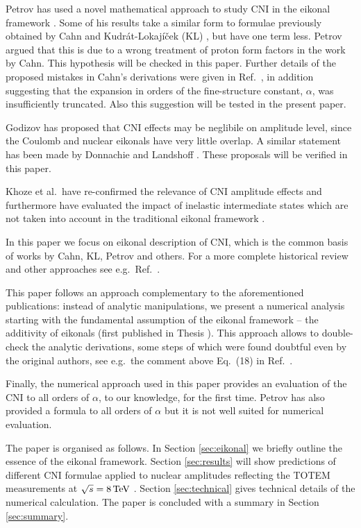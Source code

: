 \documentclass[pdftex,twocolumn,epjc3]{svjour3}
\def\un#1{\,{\rm #1}}
\begin{document}
Petrov has used a novel mathematical approach to study CNI in the eikonal framework \cite{petrov2018,petrov2018-erratum}. Some of his results take a similar form to formulae previously obtained by Cahn \cite{cahn82} and Kudr\'at-Lokaj\'i\v cek (KL) \cite{kl94}, but have one term less. Petrov argued that this is due to a wrong treatment of proton form factors in the work by Cahn. This hypothesis will be checked in this paper. Further details of the proposed mistakes in Cahn's derivations were given in Ref.~\cite{petrov2019}, in addition suggesting that the expansion in orders of the fine-structure constant, $\alpha$, was insufficiently truncated. Also this suggestion will be tested in the present paper.

Godizov has proposed that CNI effects may be neglibile on amplitude level, since the Coulomb and nuclear eikonals have very little overlap\cite{godizov2019}. A similar statement has been made by Donnachie and Landshoff \cite{donnachie2019}. These proposals will be verified in this paper.

Khoze et al.~have re-confirmed the relevance of CNI amplitude effects and furthermore have evaluated the impact of inelastic intermediate states which are not taken into account in the traditional eikonal framework \cite{kmr2019}.

In this paper we focus on eikonal description of CNI, which is the common basis of works by Cahn, KL, Petrov and others. For a more complete historical review and other approaches see e.g.~Ref.~\cite{thesis}.

This paper follows an approach complementary to the aforementioned publications: instead of analytic manipulations, we present a numerical analysis starting with the fundamental assumption of the eikonal framework -- the additivity of eikonals (first published in Thesis \cite{thesis}). This approach allows to double-check the analytic derivations, some steps of which were found doubtful even by the original authors, see e.g.~the comment above Eq.~(18) in Ref.~\cite{cahn82}.

Finally, the numerical approach used in this paper provides an evaluation of the CNI to all orders of $\alpha$, to our knowledge, for the first time. Petrov has also provided a formula to all orders of $\alpha$ \cite{petrov2018} but it is not well suited for numerical evaluation.

The paper is organised as follows. In Section \ref{sec:eikonal} we briefly outline the essence of the eikonal framework. Section \ref{sec:results} will show predictions of different CNI formulae applied to nuclear amplitudes reflecting the TOTEM measurements at $\sqrt s = 8\un{TeV}$ \cite{totem-8tev-1km}. Section \ref{sec:technical} gives technical details of the numerical calculation. The paper is concluded with a summary in Section \ref{sec:summary}.
\end{document}
